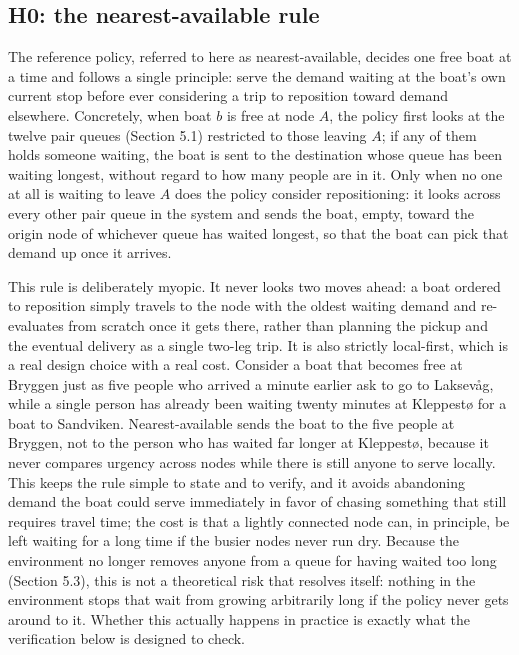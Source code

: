 \documentclass[11pt,a4paper]{article}
\begin{document}
\subsection{H0: the nearest-available rule}

The reference policy, referred to here as nearest-available, decides one free boat at a time and follows a single principle: serve the demand waiting at the boat's own current stop before ever considering a trip to reposition toward demand elsewhere. Concretely, when boat $b$ is free at node $A$, the policy first looks at the twelve pair queues (Section 5.1) restricted to those leaving $A$; if any of them holds someone waiting, the boat is sent to the destination whose queue has been waiting longest, without regard to how many people are in it. Only when no one at all is waiting to leave $A$ does the policy consider repositioning: it looks across every other pair queue in the system and sends the boat, empty, toward the origin node of whichever queue has waited longest, so that the boat can pick that demand up once it arrives.

This rule is deliberately myopic. It never looks two moves ahead: a boat ordered to reposition simply travels to the node with the oldest waiting demand and re-evaluates from scratch once it gets there, rather than planning the pickup and the eventual delivery as a single two-leg trip. It is also strictly local-first, which is a real design choice with a real cost. Consider a boat that becomes free at Bryggen just as five people who arrived a minute earlier ask to go to Laksevåg, while a single person has already been waiting twenty minutes at Kleppestø for a boat to Sandviken. Nearest-available sends the boat to the five people at Bryggen, not to the person who has waited far longer at Kleppestø, because it never compares urgency across nodes while there is still anyone to serve locally. This keeps the rule simple to state and to verify, and it avoids abandoning demand the boat could serve immediately in favor of chasing something that still requires travel time; the cost is that a lightly connected node can, in principle, be left waiting for a long time if the busier nodes never run dry. Because the environment no longer removes anyone from a queue for having waited too long (Section 5.3), this is not a theoretical risk that resolves itself: nothing in the environment stops that wait from growing arbitrarily long if the policy never gets around to it. Whether this actually happens in practice is exactly what the verification below is designed to check.
\end{document}
